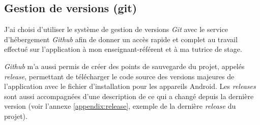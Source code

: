 \subsection{Gestion de versions (git)}

J'ai choisi d'utiliser le système de gestion de versions \textit{Git} avec le service d'hébergement \textit{Github} afin de donner un accès rapide et complet au travail effectué sur l'application à mon enseignant-référent et à ma tutrice de stage.

\textit{Github} m'a aussi permis de créer des points de sauvegarde du projet, appelés \textit{release}, permettant de télécharger le code source des versions majeures de l'application avec le fichier d'installation pour les appareils Android. Les \textit{releases} sont aussi accompagnées d'une description de ce qui a changé depuis la dernière version (voir l'annexe \ref{appendix:release}, exemple de la dernière \textit{release} du projet).











